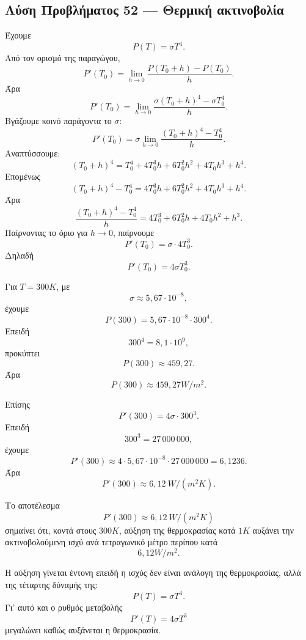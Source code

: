 \subsection*{Λύση Προβλήματος 52 --- Θερμική ακτινοβολία}

\begin{alist}
  \item Έχουμε
        \[
          P(T)=\sigma T^4.
        \]
        Από τον ορισμό της παραγώγου,
        \[
          P'(T_0)
          =
          \lim_{h\to0}\frac{P(T_0+h)-P(T_0)}{h}.
        \]
        Άρα
        \[
          P'(T_0)
          =
          \lim_{h\to0}
          \frac{\sigma(T_0+h)^4-\sigma T_0^4}{h}.
        \]
        Βγάζουμε κοινό παράγοντα το \(\sigma\):
        \[
          P'(T_0)
          =
          \sigma
          \lim_{h\to0}
          \frac{(T_0+h)^4-T_0^4}{h}.
        \]
        Αναπτύσσουμε:
        \[
          (T_0+h)^4
          =
          T_0^4+4T_0^3h+6T_0^2h^2+4T_0h^3+h^4.
        \]
        Επομένως
        \[
          (T_0+h)^4-T_0^4
          =
          4T_0^3h+6T_0^2h^2+4T_0h^3+h^4.
        \]
        Άρα
        \[
          \frac{(T_0+h)^4-T_0^4}{h}
          =
          4T_0^3+6T_0^2h+4T_0h^2+h^3.
        \]
        Παίρνοντας το όριο για \(h\to0\), παίρνουμε
        \[
          P'(T_0)
          =
          \sigma\cdot4T_0^3.
        \]
        Δηλαδή
        \[
          {P'(T_0)=4\sigma T_0^3}.
        \]

  \item Για \(T=300\si{K}\), με
        \[
          \sigma\approx5{,}67\cdot10^{-8},
        \]
        έχουμε
        \[
          P(300)
          =
          5{,}67\cdot10^{-8}\cdot300^4.
        \]
        Επειδή
        \[
          300^4=8{,}1\cdot10^9,
        \]
        προκύπτει
        \[
          P(300)
          \approx
          459{,}27.
        \]
        Άρα
        \[
          {P(300)\approx459{,}27\si{W/m^2}}.
        \]

        Επίσης
        \[
          P'(300)=4\sigma\cdot300^3.
        \]
        Επειδή
        \[
          300^3=27\,000\,000,
        \]
        έχουμε
        \[
          P'(300)
          \approx
          4\cdot5{,}67\cdot10^{-8}\cdot27\,000\,000
          =
          6{,}1236.
        \]
        Άρα
        \[
          {P'(300)\approx6{,}12\ \si{W/(m^2K)}}.
        \]

  \item Το αποτέλεσμα
        \[
          P'(300)\approx6{,}12\ \si{W/(m^2K)}
        \]
        σημαίνει ότι, κοντά στους \(300\si{K}\), αύξηση της θερμοκρασίας
        κατά \(1\si{K}\) αυξάνει την ακτινοβολούμενη ισχύ ανά τετραγωνικό
        μέτρο περίπου κατά
        \[
          6{,}12\si{W/m^2}.
        \]

        Η αύξηση γίνεται έντονη επειδή η ισχύς δεν είναι ανάλογη της
        θερμοκρασίας, αλλά της τέταρτης δύναμής της:
        \[
          P(T)=\sigma T^4.
        \]
        Γι' αυτό και ο ρυθμός μεταβολής
        \[
          P'(T)=4\sigma T^3
        \]
        μεγαλώνει καθώς αυξάνεται η θερμοκρασία.
\end{alist}
